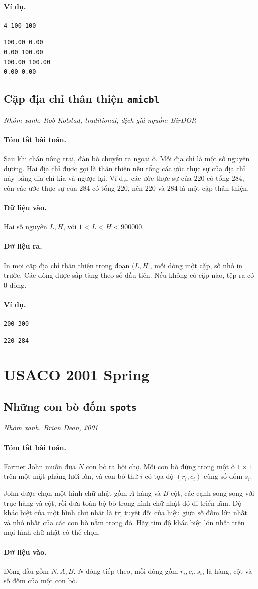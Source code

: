 \documentclass[11pt]{article}
\newcommand{\problem}[4]{%
  \subsection[#1 (#2)]{#1 \hfill {\normalsize\texttt{#2}}}%
  \noindent\textit{#3. #4}\par\smallskip
}
\newcommand{\iosec}[1]{\paragraph{#1}}
\begin{document}
\iosec{Ví dụ.}
\begin{verbatim}
4 100 100
\end{verbatim}

\begin{verbatim}
100.00 0.00
0.00 100.00
100.00 100.00
0.00 0.00
\end{verbatim}

\problem{Cặp địa chỉ thân thiện}{amicbl}{Nhóm xanh}{Rob Kolstad, traditional; dịch giả nguồn: BirDOR}

\iosec{Tóm tắt bài toán.}
Sau khi chán nông trại, đàn bò chuyển ra ngoại ô. Mỗi địa chỉ là một số nguyên
dương. Hai địa chỉ được gọi là thân thiện nếu tổng các ước thực sự của địa chỉ
này bằng địa chỉ kia và ngược lại. Ví dụ, các ước thực sự của \(220\) có tổng
\(284\), còn các ước thực sự của \(284\) có tổng \(220\), nên \(220\) và
\(284\) là một cặp thân thiện.

\iosec{Dữ liệu vào.}
Hai số nguyên \(L,H\), với \(1<L<H<900000\).

\iosec{Dữ liệu ra.}
In mọi cặp địa chỉ thân thiện trong đoạn \((L,H]\), mỗi dòng một cặp, số nhỏ
in trước. Các dòng được sắp tăng theo số đầu tiên. Nếu không có cặp nào, tệp
ra có \(0\) dòng.

\iosec{Ví dụ.}
\begin{verbatim}
200 300
\end{verbatim}

\begin{verbatim}
220 284
\end{verbatim}

\section{USACO 2001 Spring}

\problem{Những con bò đốm}{spots}{Nhóm xanh}{Brian Dean, 2001}

\iosec{Tóm tắt bài toán.}
Farmer John muốn đưa \(N\) con bò ra hội chợ. Mỗi con bò đứng trong một ô
\(1\times 1\) trên một mặt phẳng lưới lớn, và con bò thứ \(i\) có tọa độ
\((r_i,c_i)\) cùng số đốm \(s_i\).

John được chọn một hình chữ nhật gồm \(A\) hàng và \(B\) cột, các cạnh song
song với trục hàng và cột, rồi đưa toàn bộ bò trong hình chữ nhật đó đi triển
lãm. Độ khác biệt của một hình chữ nhật là trị tuyệt đối của hiệu giữa số đốm
lớn nhất và nhỏ nhất của các con bò nằm trong đó. Hãy tìm độ khác biệt lớn
nhất trên mọi hình chữ nhật có thể chọn.

\iosec{Dữ liệu vào.}
Dòng đầu gồm \(N,A,B\). \(N\) dòng tiếp theo, mỗi dòng gồm \(r_i,c_i,s_i\), là
hàng, cột và số đốm của một con bò.
\end{document}
